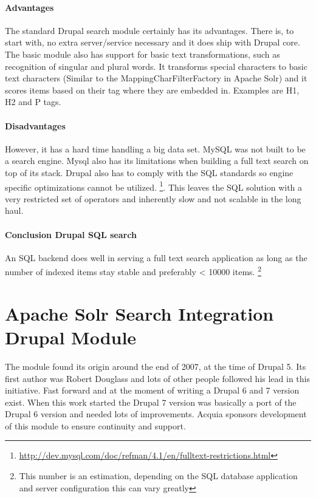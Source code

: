 \paragraph{Advantages} The standard Drupal search module certainly has its advantages. There is, to start with, no extra server/service necessary and it does ship with Drupal core. The basic module also has support for basic text transformations, such as recognition of singular and plural words. It transforms special characters to basic text characters (Similar to the MappingCharFilterFactory in Apache Solr) and it scores items based on their tag where they are embedded in. Examples are H1, H2 and P tags.

\paragraph{Disadvantages} However, it has a hard time handling a big data set. MySQL was not built to be a search engine. Mysql also has its limitations when building a full text search on top of its stack. Drupal also has to comply with the SQL standards so engine specific optimizations cannot be utilized. \footnote{\url{http://dev.mysql.com/doc/refman/4.1/en/fulltext-restrictions.html}}. This leaves the SQL solution with a very restricted set of operators and inherently slow and not scalable in the long haul. 

\paragraph{Conclusion Drupal SQL search} An SQL backend does well in serving a full text search application as long as the number of indexed items stay stable and preferably < 10000 items. \footnote{This number is an estimation, depending on the SQL database application and server configuration this can vary greatly}

\section{Apache Solr Search Integration Drupal Module}
The module found its origin around the end of 2007, at the time of Drupal 5. Its first author was Robert Douglass and lots of other people followed his lead in this initiative. Fast forward and at the moment of writing a Drupal 6 and 7 version exist. When this work started the Drupal 7 version was basically a port of the Drupal 6 version and needed lots of improvements. Acquia sponsors development of this module to ensure continuity and support.

